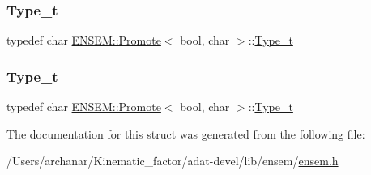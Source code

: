 \subsubsection{\texorpdfstring{Type\_t}{Type\_t}\hspace{0.1cm}{\footnotesize\ttfamily [2/3]}}
{\footnotesize\ttfamily typedef char \mbox{\hyperlink{structENSEM_1_1Promote}{E\+N\+S\+E\+M\+::\+Promote}}$<$ bool, char $>$\+::\mbox{\hyperlink{structENSEM_1_1Promote_3_01bool_00_01char_01_4_a77d88dbc5eb685f290b3b9bb1b2b2a67}{Type\+\_\+t}}}

\mbox{\label{structENSEM_1_1Promote_3_01bool_00_01char_01_4_a77d88dbc5eb685f290b3b9bb1b2b2a67}} 
\subsubsection{\texorpdfstring{Type\_t}{Type\_t}\hspace{0.1cm}{\footnotesize\ttfamily [3/3]}}
{\footnotesize\ttfamily typedef char \mbox{\hyperlink{structENSEM_1_1Promote}{E\+N\+S\+E\+M\+::\+Promote}}$<$ bool, char $>$\+::\mbox{\hyperlink{structENSEM_1_1Promote_3_01bool_00_01char_01_4_a77d88dbc5eb685f290b3b9bb1b2b2a67}{Type\+\_\+t}}}



The documentation for this struct was generated from the following file\+:\begin{DoxyCompactItemize}
\item 
/\+Users/archanar/\+Kinematic\+\_\+factor/adat-\/devel/lib/ensem/\mbox{\hyperlink{adat-devel_2lib_2ensem_2ensem_8h}{ensem.\+h}}\end{DoxyCompactItemize}
